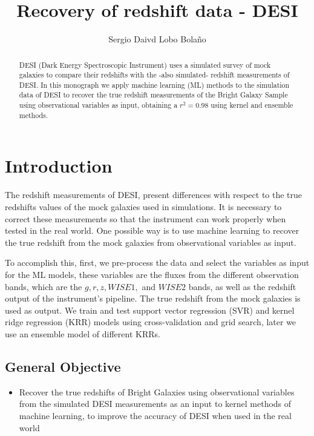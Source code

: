 \documentclass[]{article}
\title{Recovery of redshift data - DESI}
\author{Sergio Daivd Lobo Bolaño}
\begin{document}
\maketitle

\begin{abstract}
DESI (Dark Energy Spectroscopic Instrument) uses a simulated survey of mock galaxies to compare their redshifts with the -also simulated- redshift measurements of DESI. In this monograph we apply machine learning (ML) methods to the simulation data of DESI to recover the true redshift measurements of the Bright Galaxy Sample using observational variables as input, obtaining a $r^2 = 0.98$ using kernel and ensemble methods. 
\end{abstract}

\section{Introduction}
The redshift measurements of DESI, present differences with respect to the true redshifts values of the mock galaxies used in simulations. It is necessary to correct these measurements so that the instrument can work properly when tested in the real world. One possible way is to use machine learning to recover the true redshift from the mock galaxies from observational variables as input. 

To accomplish this, first, we pre-process the data and select the variables as input for the ML models, these variables are the fluxes from the different observation bands, which are the $g, r, z, WISE 1,$ and $WISE 2$ bands, as well as the redshift output of the instrument's pipeline. The true redshift from the mock galaxies is used as output. We train and test support vector regression (SVR) and kernel ridge regression (KRR) models using cross-validation and grid search, later we use an ensemble model of different KRRs. 
 
\subsection{General Objective}
\begin{itemize}
	\item Recover the true redshifts of Bright Galaxies using observational variables from the simulated DESI measurements as an input to kernel methods of machine learning, to improve the accuracy of DESI when used in the real world
\end{itemize}
\end{document}
